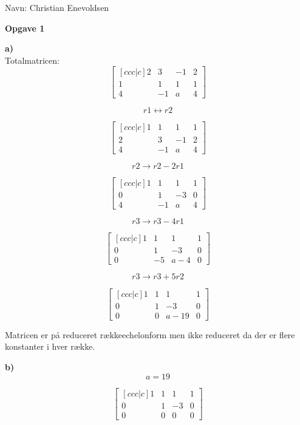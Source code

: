\documentclass[12pt,a4paper]{article}
\begin{document}
\newpage

Navn: Christian Enevoldsen


{\bf Opgave 1 }

\textbf{a)}\\

Totalmatricen: \\

\[
\begin{bmatrix}[ccc|c]
  2 & 3 & -1  &  2 \\
  1 & 1 & 1 & 1 \\
  4 & -1 & a &  4
\end{bmatrix}
\]

\[ r1 \leftrightarrow r2 \]

\[
\begin{bmatrix}[ccc|c]
  1 & 1 & 1 & 1 \\
  2 & 3 & -1  &  2 \\
  4 & -1 & a &  4
\end{bmatrix}
\]

\[ r2 \rightarrow r2 - 2r1 \]

\[
\begin{bmatrix}[ccc|c]
  1 & 1 & 1 & 1 \\
  0 & 1 & -3  &  0 \\
  4 & -1 & a &  4
\end{bmatrix}
\]

\[ r3 \rightarrow r3 - 4r1 \]

\[
\begin{bmatrix}[ccc|c]
  1 & 1 & 1 & 1 \\
  0 & 1 & -3  &  0 \\
  0 & -5 & a-4 &  0
\end{bmatrix}
\]

\[ r3 \rightarrow r3 + 5r2 \]

\[
\begin{bmatrix}[ccc|c]
  1 & 1 & 1 & 1 \\
  0 & 1 & -3  &  0 \\
  0 & 0 & a-19 &  0
\end{bmatrix}
\]

Matricen er på reduceret rækkeechelonform men ikke reduceret da der er flere konstanter i hver række.

\textbf{b)}\\

\[a = 19\]

\[
\begin{bmatrix}[ccc|c]
  1 & 1 & 1 & 1 \\
  0 & 1 & -3  &  0 \\
  0 & 0 & 0 &  0
\end{bmatrix}
\]
\end{document}
